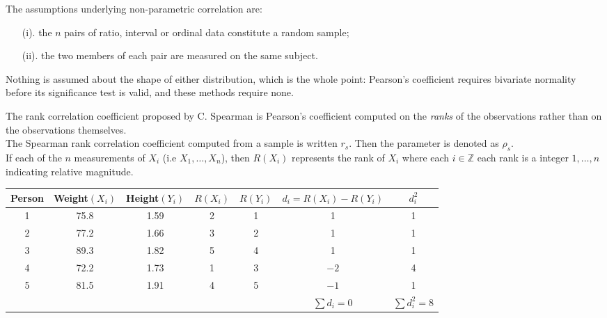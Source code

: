 \documentclass[11pt,a4paper]{article}
\theoremstyle{definition}
\begin{document}
The assumptions underlying non-parametric correlation are:
\begin{enumerate}
\item[(i).] the $n$ pairs of ratio, interval or ordinal data constitute a random
sample;
\item[(ii).] the two members of each pair are measured on the same subject.
\end{enumerate}
Nothing is assumed about the shape of either distribution, which is the whole
point: Pearson's coefficient requires bivariate normality before its significance
test is valid, and these methods require none.

The rank correlation coefficient proposed by C. Spearman is Pearson's coefficient computed on the \emph{ranks} of the observations rather than on the observations themselves.\\
The Spearman rank correlation coefficient computed from a sample is written $r_s$. Then the parameter is denoted as $\rho_s$.\\ If each of the $n$ measurements of $X_i$ (i.e $X_1,\dots,X_n$), then  $R(X_i)$ represents the rank of $X_i$ where each $i\in \mathbb{Z}$ each rank is a integer $1,\dots,n$ indicating relative magnitude.



\begin{table}[H]
\centering
\begin{tabular}{c|c|c|c|c|c|c}
Person & Weight$(X_i)$ & Height$(Y_i)$&$R(X_i)$&$R(Y_i)$&$d_i=R(X_i)-R(Y_i)$&$d_i^2$\\
\hline 1&75.8&1.59&2&1&1&1\\
2&77.2&1.66&3&2&1&1\\
3&89.3&1.82&5&4&1&1\\
4&72.2&1.73&1&3&$-2$&4\\
5&81.5&1.91&4&5&$-1$&1\\
\hline
 & & & & & $\sum d_i = 0$ & $\sum d_i^{2} = 8$\\
\hline
\end{tabular}
\end{table}
\end{document}

